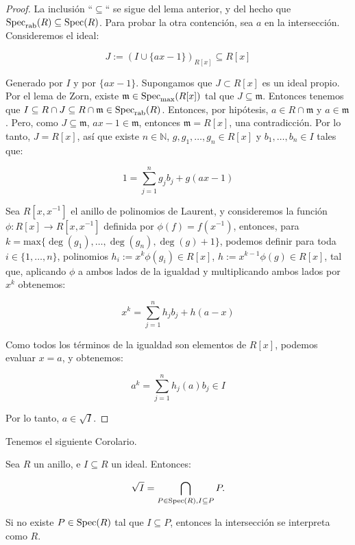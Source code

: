 \begin{proof}
La inclusión ``$\subseteq$`` se sigue del lema anterior, y del hecho que $\textrm{Spec}_{\textrm{rab}}(R) \subseteq \textrm{Spec}(R)$.
Para probar la otra contención, sea $a$ en la intersección. Consideremos el ideal:

$$ J := (I \cup \{ax - 1\})_{R[x]} \subseteq R[x] $$

Generado por $I$ y por $\{ax - 1\}$. Supongamos que $J \subset R[x]$ es un ideal propio. Por el lema de Zorn, existe $\mathfrak{m} \in \textrm{Spec}_{\textrm{max}}(R[x])$ tal que $J \subseteq \mathfrak{m}$. Entonces tenemos que $I \subseteq R \cap J \subseteq R \cap \mathfrak{m} \in \textrm{Spec}_{\textrm{rab}}(R)$. Entonces, por hipótesis, $a \in R \cap \mathfrak{m}$ y $a \in \mathfrak{m}$. Pero, como $J \subseteq \mathfrak{m}$, $ax - 1 \in \mathfrak{m}$, entonces $\mathfrak{m} =  R[x]$, una contradicción. Por lo tanto, $J = R[x]$, así que existe $n \in \mathbb{N}$, $g, g_1, \dots, g_n \in R[x]$ y $b_1,\dots,b_n \in I$ tales que:

$$ 1 = \sum_{j=1}^ng_jb_j + g(ax - 1) $$

Sea $R[x, x^{-1}]$ el anillo de polinomios de Laurent, y consideremos la función $\phi: R[x] \rightarrow R[x,x^{-1}]$ definida por $\phi(f) = f(x^{-1})$, entonces, para $k = \textrm{max}\{\deg(g_1),\dots,\deg(g_n),\deg(g) + 1\}$, podemos definir para toda $i \in \{1,\dots,n\}$, polinomios $h_i := x^k\phi(g_i) \in R[x]$, $h := x^{k-1}\phi(g) \in R[x]$, tal que, aplicando $\phi$ a ambos lados de la igualdad y multiplicando ambos lados por $x^k$ obtenemos:

$$ x^k = \sum_{j = 1}^nh_jb_j + h(a - x) $$

Como todos los términos de la igualdad son elementos de $R[x]$, podemos evaluar $x = a$, y obtenemos:

$$ a^k = \sum_{j = 1}^nh_j(a)b_j \in I $$

Por lo tanto, $a \in \sqrt{I}$.
\end{proof}

Tenemos el siguiente Corolario.

\begin{corollary}\label{radical = spec - nullstellensatz}
Sea $R$ un anillo, e $I \subseteq R$ un ideal. Entonces:

$$\sqrt{I} = \bigcap_{P \in \textrm{Spec}(R), I \subseteq P} P.$$

Si no existe $P \in \textrm{Spec}(R)$ tal que $I \subseteq P$, entonces la intersección se interpreta como $R$.
\end{corollary}

